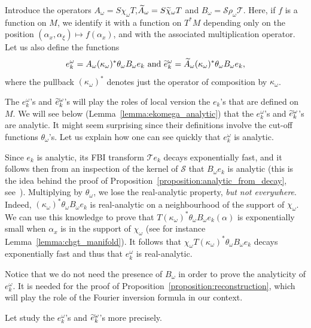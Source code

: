 \documentclass[AHL,Unicode,longabstracts,published]{cedram}
\newcommand{\clT}{\mathcal{T}}
\newcommand{\clS}{\mathcal{S}}
\let\oldtilde\tilde
\renewcommand*{\tilde}[1]{\mathchoice{\widetilde{#1}}{\widetilde{#1}}{\oldtilde{#1}}{\oldtilde{#1}}}
\begin{document}
Introduce the operators $A_\omega = S \chi_\omega T$,$\widetilde{A}_\omega = S\tilde{\chi}_\omega T$ and $B_\omega = \clS\rho_\omega \clT$. Here, if $f$ is a function on $M$, we identify it with a function on $T^* M$ depending only on the position $(\alpha_x,\alpha_\xi) \mapsto f(\alpha_x)$, and with the associated multiplication operator. Let us also define the functions
\begin{equation*}
e_k^\omega = A_\omega (\kappa_\omega)^* \theta_\omega B_\omega e_k \text{ and } \tilde{e}_k^\omega = \widetilde{A}_\omega (\kappa_\omega)^* \theta_\omega B_\omega e_k,
\end{equation*}
where the pullback $(\kappa_\omega)^*$ denotes just the operator of composition by $\kappa_\omega$.

\begin{rema}
The $e_k^\omega$'s and $\tilde{e}_k^\omega$'s will play the roles of local version the $e_k$'s that are defined on $M$. We will see below (Lemma~\ref{lemma:ekomega_analytic}) that the $e_k^\omega$'s and $\tilde{e}_k^\omega$'s are analytic. It might seem surprising since their definitions involve the cut-off functions $\theta_\omega$'s. Let us explain how one can see quickly that $e_k^\omega$ is analytic.

Since $e_k$ is analytic, its FBI transform $\clT e_k$ decays exponentially fast, and it follows then from an inspection of the kernel of $\clS$ that $B_\omega e_k$ is analytic (this is the idea behind the proof of Proposition~\ref{proposition:analytic_from_decay}, see~\cite[Lemma~2.6]{BJ20}). Multiplying by $\theta_\omega$, we lose the real-analytic property, \emph{but not everywhere}. Indeed, $(\kappa_\omega)^* \theta_\omega B_\omega e_k$ is real-analytic on a neighbourhood of the support of $\chi_\omega$. We can use this knowledge to prove that $T (\kappa_\omega)^* \theta_\omega B_\omega e_k(\alpha)$ is exponentially small when $\alpha_x$ is in the support of $\chi_\omega$ (see for instance Lemma~\ref{lemma:chgt_manifold}). It follows that $\chi_\omega T(\kappa_\omega)^* \theta_\omega B_\omega e_k$ decays exponentially fast and thus that $e_k^\omega$ is real-analytic.

Notice that we do not need the presence of $B_\omega$ in order to prove the analyticity of $e_k^\omega$. It is needed for the proof of Proposition~\ref{proposition:reconstruction}, which will play the role of the Fourier inversion formula in our context.
\end{rema}

Let study the $e_k^\omega$'s and $\tilde{e}_k^\omega$'s more precisely.
\end{document}
